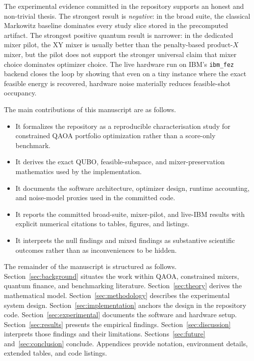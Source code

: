 \documentclass[11pt]{article}
\begin{document}
The experimental evidence committed in the repository supports an honest and non-trivial thesis. The strongest result is \emph{negative}: in the broad suite, the classical Markowitz baseline dominates every study slice stored in the precomputed artifact. The strongest positive quantum result is narrower: in the dedicated mixer pilot, the \(\mathrm{XY}\) mixer is usually better than the penalty-based \(\mathrm{product}\text{-}X\) mixer, but the pilot does not support the stronger universal claim that mixer choice dominates optimizer choice. The live hardware run on IBM's \texttt{ibm\_fez} backend closes the loop by showing that even on a tiny instance where the exact feasible energy is recovered, hardware noise materially reduces feasible-shot occupancy.

The main contributions of this manuscript are as follows.
\begin{itemize}[leftmargin=1.5em]
\item It formalizes the repository as a reproducible characterisation study for constrained QAOA portfolio optimization rather than a score-only benchmark.
\item It derives the exact QUBO, feasible-subspace, and mixer-preservation mathematics used by the implementation.
\item It documents the software architecture, optimizer design, runtime accounting, and noise-model proxies used in the committed code.
\item It reports the committed broad-suite, mixer-pilot, and live-IBM results with explicit numerical citations to tables, figures, and listings.
\item It interprets the null findings and mixed findings as substantive scientific outcomes rather than as inconveniences to be hidden.
\end{itemize}

The remainder of the manuscript is structured as follows. Section~\ref{sec:background} situates the work within QAOA, constrained mixers, quantum finance, and benchmarking literature. Section~\ref{sec:theory} derives the mathematical model. Section~\ref{sec:methodology} describes the experimental system design. Section~\ref{sec:implementation} anchors the design in the repository code. Section~\ref{sec:experimental} documents the software and hardware setup. Section~\ref{sec:results} presents the empirical findings. Section~\ref{sec:discussion} interprets those findings and their limitations. Sections~\ref{sec:future} and~\ref{sec:conclusion} conclude. Appendices provide notation, environment details, extended tables, and code listings.
\end{document}
